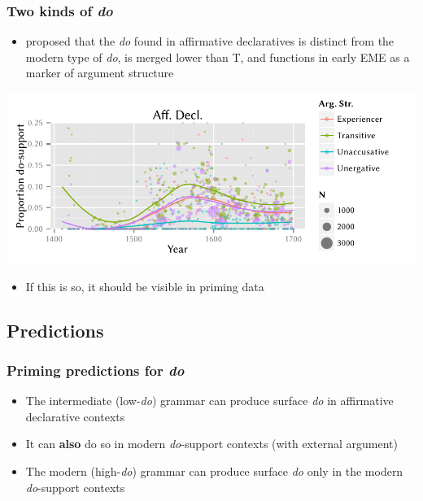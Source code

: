 \documentclass{digs-slides}
\begin{document}
\begin{frame}
    \frametitle{Two kinds of \emph{do}}
    \begin{itemize}
      \item \textcite{Ecay2012a} proposed that the \emph{do} found in
        affirmative declaratives is distinct from the modern type of
        \emph{do}, is merged lower than T, and functions in early EME as
        a marker of argument structure
    \end{itemize}
    \includegraphics[width=\textwidth]{static-figures/do-aff}
    \begin{itemize}
      \item If this is so, it should be visible in priming data
    \end{itemize}
\end{frame}

\subsection{Predictions}
\label{sec:predictions}

\begin{frame}
    \frametitle{Priming predictions for \emph{do}}
    \begin{itemize}
      \item The intermediate (low-\emph{do}) grammar can produce surface
        \emph{do} in affirmative declarative contexts
      \item It can \textbf{also} do so in modern \emph{do}-support
        contexts (with external argument)
      \item The modern (high-\emph{do}) grammar can produce surface
        \emph{do} only in the modern \emph{do}-support contexts
    \end{itemize}
\end{frame}
\end{document}
